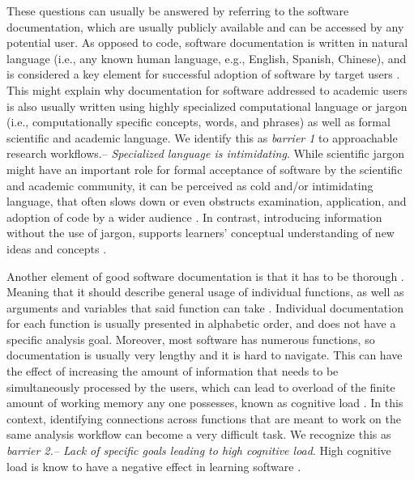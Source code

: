 \documentclass[12pt]{article}
\begin{document}
These questions can usually be answered by referring to the software documentation,
which are usually publicly available and can be accessed by any potential user.
As opposed to code, software documentation is written in natural language (i.e.,
any known human language, e.g., English, Spanish, Chinese), and is considered
a key element for successful adoption of software
by target users \citep{karimzadeh2018top}. This might explain
why documentation for software addressed to academic users is also
usually written using highly specialized computational
language or jargon (i.e., computationally specific concepts,
words, and phrases) as well as formal scientific and academic language.
We identify this as \textit{barrier 1} to approachable research workflows.--
\textit{Specialized language is intimidating}.
While scientific jargon might have an important role for formal acceptance
of software by the scientific and academic community, it can be perceived as
cold and/or intimidating language, that often slows down or even
obstructs examination, application, and adoption of code by a wider audience
\citep{ball2017its}.
In contrast, introducing information without the use of jargon, supports learners'
conceptual understanding of new ideas and concepts \citep{mcdonnell2016concepts, pan2019online}.

Another element of good software documentation is that it has to be thorough \citep{karimzadeh2018top}.
Meaning that it should describe general usage of individual functions, as well as
arguments and variables that said function can take \citep{karimzadeh2018top}.
Individual documentation for each function is usually presented in alphabetic order,
and does not have a specific analysis goal.
Moreover, most software has numerous functions, so documentation is usually very
lengthy and it is hard to navigate.
This can have the effect of increasing the amount of information that needs to be
simultaneously processed by the users, which can lead to overload of the finite amount
of working memory any one possesses, known as cognitive load \citep{sweller1988cognitive}.
In this context, identifying connections across functions that are meant to work
on the same analysis workflow can become a very difficult task.
We recognize this as \textit{barrier 2.-- Lack of specific goals leading to high cognitive load}.
High cognitive load is know to have a negative effect in learning software
\citep{chandler1996cognitive, van2005research, lambert2009student}.
\end{document}
